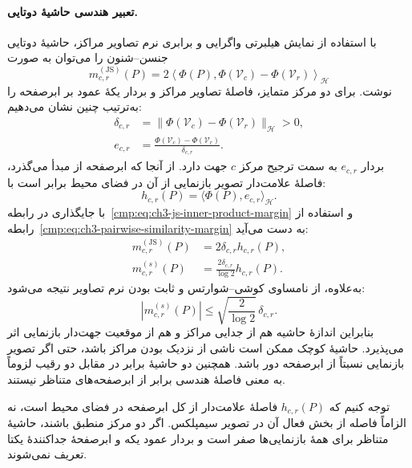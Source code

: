 \paragraph{تعبیر هندسی حاشیهٔ دوتایی.}
با استفاده از نمایش هیلبرتی واگرایی و
برابری نرم تصاویر مراکز، حاشیهٔ دوتایی
جنسن--شنون را می‌توان به صورت
\begin{equation}\label{cmp:eq:ch3-js-inner-product-margin}
m_{c,r}^{(\mathrm{JS})}(P)
=2\left\langle\Phi(P),
\Phi(\mathcal V_c)-\Phi(\mathcal V_r)
\right\rangle_{\mathcal H}
\end{equation}
نوشت. برای دو مرکز متمایز، فاصلهٔ تصاویر
مراکز و بردار یکهٔ عمود بر ابرصفحه را
به‌ترتیب چنین نشان می‌دهیم:
\begin{equation}\label{cmp:eq:ch3-js-hyperplane-normal}
\begin{aligned}
\delta_{c,r}
&=\|\Phi(\mathcal V_c)-\Phi(\mathcal V_r)\|_{\mathcal H}>0,\\
e_{c,r}
&=\frac{\Phi(\mathcal V_c)-\Phi(\mathcal V_r)}
{\delta_{c,r}}.
\end{aligned}
\end{equation}
بردار $e_{c,r}$ به سمت ترجیح مرکز $c$
جهت دارد. از آنجا که ابرصفحه از مبدأ
می‌گذرد، فاصلهٔ علامت‌دار تصویر بازنمایی
از آن در فضای محیط برابر است با:
\begin{equation}\label{cmp:eq:ch3-js-signed-hyperplane-distance}
h_{c,r}(P)=\langle\Phi(P),e_{c,r}\rangle_{\mathcal H}.
\end{equation}
با جایگذاری در
رابطه~\eqref{cmp:eq:ch3-js-inner-product-margin}
و استفاده از
رابطه~\eqref{cmp:eq:ch3-pairwise-similarity-margin}
به دست می‌آید:
\begin{equation}\label{cmp:eq:ch3-js-margin-separation-factorization}
\boxed{
\begin{aligned}
m_{c,r}^{(\mathrm{JS})}(P)&=2\delta_{c,r}h_{c,r}(P),\\
m_{c,r}^{(s)}(P)&=\frac{2\delta_{c,r}}{\log2}h_{c,r}(P).
\end{aligned}
}
\end{equation}
به‌علاوه، از نامساوی کوشی--شوارتس و
ثابت بودن نرم تصاویر نتیجه می‌شود:
\[
|m_{c,r}^{(s)}(P)|
\le\sqrt{\frac{2}{\log2}}\,\delta_{c,r}.
\]
بنابراین اندازهٔ حاشیه هم از جدایی مراکز
و هم از موقعیت جهت‌دار بازنمایی اثر می‌پذیرد.
حاشیهٔ کوچک ممکن است ناشی از نزدیک بودن
مراکز باشد، حتی اگر تصویر بازنمایی نسبتاً
از ابرصفحه دور باشد. همچنین دو حاشیهٔ برابر
در مقابل دو رقیب لزوماً به معنی فاصلهٔ
هندسی برابر از ابرصفحه‌های متناظر نیستند.

توجه کنیم که $h_{c,r}(P)$ فاصلهٔ علامت‌دار
از کل ابرصفحه در فضای محیط است، نه الزاماً
فاصله از بخش فعال آن در تصویر سیمپلکس.
اگر دو مرکز منطبق باشند، حاشیهٔ متناظر
برای همهٔ بازنمایی‌ها صفر است و بردار
عمود یکه و ابرصفحهٔ جداکنندهٔ یکتا
تعریف نمی‌شوند.

